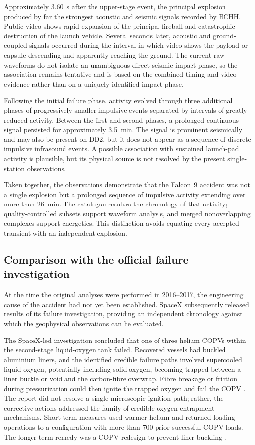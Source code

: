 \documentclass[]{seismica}
\begin{document}
Approximately 3.60~s after the upper-stage event, the principal explosion
produced by far the strongest acoustic and seismic signals recorded by BCHH.
Public video shows rapid expansion of the principal fireball and catastrophic
destruction of the launch vehicle. Several seconds later, acoustic and ground-coupled signals occurred during
the interval in which video shows the payload or capsule descending and
apparently reaching the ground. The current raw waveforms do not isolate an
unambiguous direct seismic impact phase, so the association remains tentative
and is based on the combined timing and video evidence rather than on a uniquely
identified impact phase.

Following the initial failure phase, activity evolved through three
additional phases of progressively smaller impulsive events separated by
intervals of greatly reduced activity. Between the first and second phases, a
prolonged continuous signal persisted for approximately 3.5~min. The signal is
prominent seismically and may also be present on DD2, but it does not appear as
a sequence of discrete impulsive infrasound events. A possible association with
sustained launch-pad activity is plausible, but its physical source is not
resolved by the present single-station observations.

Taken together, the observations demonstrate that the Falcon~9 accident was
not a single explosion but a prolonged sequence of impulsive activity extending
over more than 26~min. The catalogue resolves the chronology of that activity;
quality-controlled subsets support waveform analysis, and merged nonoverlapping
complexes support energetics. This distinction avoids equating every accepted
transient with an independent explosion.

\subsection{Comparison with the official failure investigation}
\label{sec:discussion_investigation}

At the time the original analyses were performed in 2016--2017, the engineering cause of the accident had not yet been established. SpaceX subsequently released results of its failure investigation, providing an independent chronology against which the geophysical observations can be evaluated.

The SpaceX-led investigation concluded that one of three helium COPVs within
the second-stage liquid-oxygen tank failed. Recovered vessels had buckled
aluminium liners, and the identified credible failure paths involved
supercooled liquid oxygen, potentially including solid oxygen, becoming trapped
between a liner buckle or void and the carbon-fibre overwrap. Fibre breakage or
friction during pressurization could then ignite the trapped oxygen and fail the
COPV \citep{spacex_anomaly_2017,nasa_sma_falcon9}. The report did not resolve a
single microscopic ignition path; rather, the corrective actions addressed the
family of credible oxygen-entrapment mechanisms. Short-term measures used
warmer helium and returned loading operations to a configuration with more than
700 prior successful COPV loads. The longer-term remedy was a COPV redesign to
prevent liner buckling \citep{spacex_anomaly_2017}.
\end{document}
